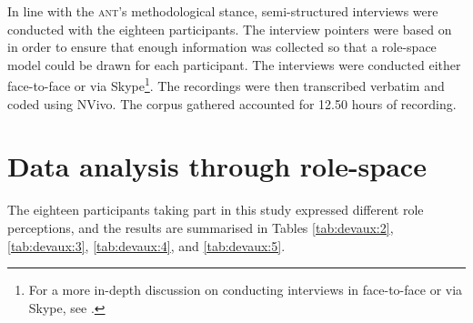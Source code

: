 \documentclass[output=paper]{langsci/langscibook}
\begin{document}
In line with the \textsc{ant}’s methodological stance, semi-structured interviews were conducted with the eighteen participants. The interview pointers were based on  in order to ensure that enough information was collected so that a role-space model could be drawn for each participant. The interviews were conducted either face-to-face or via Skype\footnote{For a more in-depth discussion on conducting interviews in face-to-face or via Skype, see \citet{Devaux2017b}.}. The recordings were then transcribed verbatim and coded using NVivo. The corpus gathered accounted for 12.50 hours of recording. 

\section{Data analysis through role-space}
\label{sec:devaux:5}
The eighteen participants taking part in this study expressed different role perceptions, and the results are summarised in Tables \ref{tab:devaux:2}, \ref{tab:devaux:3}, \ref{tab:devaux:4}, and \ref{tab:devaux:5}.

\begin{table}
\caption{Role-space in \textsc{vci a}\label{tab:devaux:2}}
\end{table}
\end{document}
